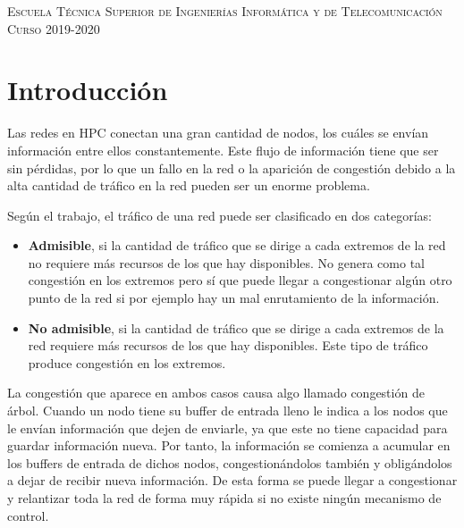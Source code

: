 \documentclass[11pt,a4paper]{article}
\begin{document}
\begin{titlepage}
\begin{minipage}{\textwidth}
\vspace{0.7cm}
\textsc{Escuela Técnica Superior de Ingenierías Informática y de Telecomunicación}\\
\vspace{1cm}
\textsc{Curso 2019-2020}
\end{minipage}
\end{titlepage}

\tableofcontents
\thispagestyle{empty}				%

\newpage

\setlength{\parskip}{1em}

\section{Introducción}

Las redes en HPC conectan una gran cantidad de nodos, los cuáles se envían
información entre ellos constantemente. Este flujo de información tiene
que ser sin pérdidas, por lo que un fallo en la red o la aparición de congestión
debido a la alta cantidad de tráfico en la red pueden ser un enorme problema.

Según el trabajo, el tráfico de una red puede ser clasificado en dos categorías:

\begin{itemize}[label=\textbullet]
	\item \textbf{Admisible}, si la cantidad de tráfico que se dirige a cada extremos de la red
	no requiere más recursos de los que hay disponibles. No genera como tal congestión
	en los extremos pero sí que puede llegar a congestionar algún otro punto de la red
	si por ejemplo hay un mal enrutamiento de la información.
	\item \textbf{No admisible}, si la cantidad de tráfico que se dirige a cada extremos de la red
	requiere más recursos de los que hay disponibles. Este tipo de tráfico produce
	congestión en los extremos.
\end{itemize}

La congestión que aparece en ambos casos causa algo llamado congestión de árbol.
Cuando un nodo tiene su buffer de entrada lleno le indica
a los nodos que le envían información que dejen de enviarle, ya que este no tiene capacidad
para guardar información nueva. Por tanto, la información se comienza a acumular en los buffers 
de entrada de dichos nodos, congestionándolos también y obligándolos a dejar de recibir
nueva información. De esta forma se puede llegar a congestionar y relantizar toda la red
de forma muy rápida si no existe ningún mecanismo de control.
\end{document}
